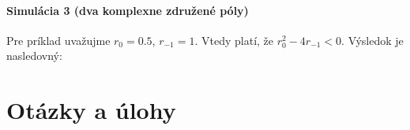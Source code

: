 \documentclass[a4paper, 10pt, ]{article}
\begin{document}
\paragraph{Simulácia 3 (dva komplexne združené póly)}

Pre príklad uvažujme $r_0 = 0.5$, $r_{-1} = 1$. Vtedy  platí, že $r_0^2 - 4r_{-1} < 0$. Výsledok je nasledovný:


\begin{center}




    \figcaption{}

\end{center}








\section{Otázky a úlohy}
\end{document}
